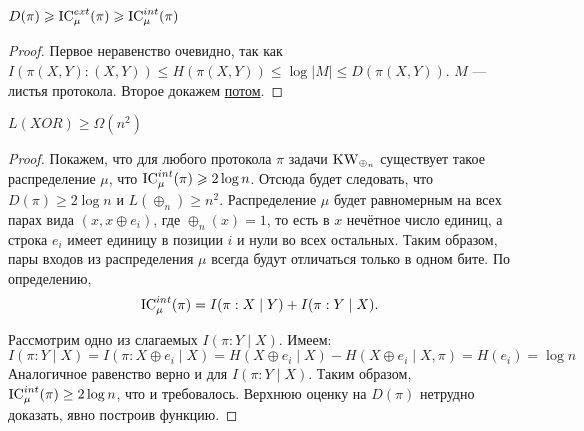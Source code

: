 \begin{thm}\label{thm:4_7_1}
	$ D( \pi) \geqslant  \operatorname{IC}_{\mu}^{ext}( \pi) \geqslant \operatorname{IC}_{ \mu}^{int}(\pi)$
\end{thm}
\begin{proof}
    Первое неравенство очевидно, так как $I(\pi(X, Y) : (X, Y)) \le H(\pi(X,Y)) \le \log |M| \le D(\pi(X, Y))$. $M$ --- листья протокола. 
    Второе докажем \hyperref[proof:thm_4_7_1]{потом}. 
\end{proof}
\begin{thm}[Храпченко]
	$ L( XOR) \ge \Omega (n^2)$
\end{thm}
\begin{proof}
       Покажем, что для любого протокола $ \pi $ задачи $ \operatorname{KW}_{\oplus_n} $ существует такое распределение $\mu$, что $ \operatorname{IC}^{int}_{\mu}(\pi) \geqslant 2\log n$. Отсюда будет следовать, что $ D(\pi) \ge 2\log n$ и $L(\oplus_n) \ge n^2 $. Распределение $ \mu $ будет равномерным на всех парах вида $ (x,x\oplus e_i)$, где $\oplus_n(x) = 1$, то есть в $ x $ нечётное число единиц, а строка $e_i$ имеет единицу в позиции $i$ и нули во всех остальных. Таким образом, пары входов из распределения $\mu$ всегда будут отличаться только в одном бите. По определению,
    $$ \operatorname{IC}^{int}_{\mu}(\pi) = I(\pi : X \mid Y) + I(\pi : Y \mid X). $$
    
    Рассмотрим одно из слагаемых $I(\pi : Y \mid X) $. Имеем:
    $$
    I(\pi : Y \mid X) = I(\pi : X \oplus e_i \mid X) = H(X \oplus e_i \mid X) - H(X\oplus e_i \mid X, \pi) = H(e_i) = \log n
    $$
    Аналогичное равенство верно и для $ I(\pi \colon Y\mid X) $. Таким образом, $\operatorname{IC}^{int}_{\mu}(\pi) \geq 2\log n $, что и требовалось. Верхнюю оценку на $ D(\pi) $ нетрудно доказать, явно построив функцию.
\end{proof}
\vspace{1em}
